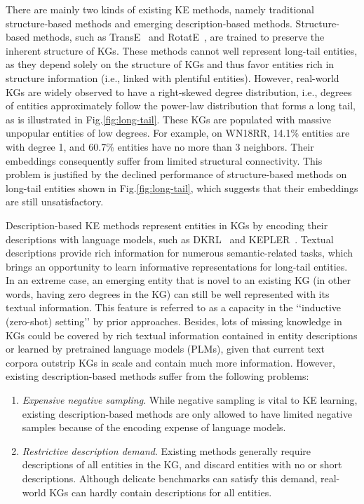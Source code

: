 \documentclass{article}
\begin{document}
There are mainly two kinds of existing KE methods, namely 
traditional structure-based methods and emerging description-based methods.
Structure-based methods, such as TransE~\cite{bordes2013transe} and RotatE~\cite{sun2019rotate}, are trained to preserve the inherent structure of KGs. 
These methods cannot well represent long-tail entities, as they depend solely on the structure of KGs and thus favor entities rich in structure information (i.e., linked with plentiful entities).
However, real-world KGs are widely observed to have a right-skewed degree distribution, i.e., 
degrees of entities approximately follow the power-law distribution that forms a long tail, as is illustrated in Fig.\ref{fig:long-tail}. 
These KGs are populated with massive unpopular entities of low degrees.
For example, on WN18RR, 
14.1\% entities are with degree 1, 
and 60.7\% entities have no more than 3 neighbors.
Their embeddings consequently suffer from limited structural connectivity. 
This problem is justified by the declined performance of structure-based methods on long-tail entities shown in Fig.\ref{fig:long-tail}, which suggests that their embeddings are still unsatisfactory. 



Description-based KE methods represent entities in KGs by encoding their descriptions with language models, such as DKRL~\cite{xie2016dkrl} and KEPLER~\cite{wang2019kepler}. 
Textual descriptions provide rich information for numerous semantic-related tasks,   
which brings an opportunity to learn informative representations for long-tail entities. 
In an extreme case,  an emerging entity that is novel to an existing KG 
(in other words, having zero degrees in the KG) 
can still be well represented with its textual information.
This feature is referred to as a capacity in the ‘‘inductive (zero-shot) setting’’ by prior approaches.
Besides, lots of missing knowledge in KGs could be covered by rich textual information contained in entity descriptions or learned by pretrained language models (PLMs), given that current text corpora outstrip KGs in scale and contain much more information.  
However, existing description-based methods suffer from the following problems:



\begin{enumerate}
    \item \emph{Expensive negative sampling}. 
While negative sampling is vital to KE learning, 
existing description-based methods are only allowed to have limited negative samples
because of the encoding expense of language models. \item \emph{Restrictive description demand}. 
Existing methods generally require descriptions of all entities in the KG, and discard entities with no or short descriptions. 
Although delicate benchmarks can satisfy this demand, 
real-world KGs can hardly contain descriptions for all entities.


\end{enumerate}
\end{document}
